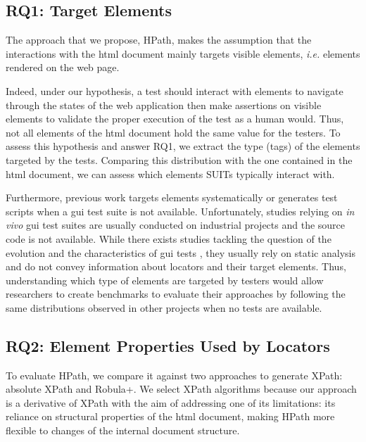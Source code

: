 \subsection{RQ1: Target Elements}
\label{sec:hpath-protocol-rq1}

The approach that we propose, HPath, makes the assumption that the interactions with the \gls{html} document mainly targets visible elements, \emph{i.e.} elements rendered on the web page. 

Indeed, under our hypothesis, a test should interact with elements to navigate through the states of the web application then make assertions on visible elements to validate the proper execution of the test as a human would. Thus, not all elements of the \gls{html} document hold the same value for the testers. To assess this hypothesis and answer RQ1, we extract the type (tags) of the elements targeted by the tests. Comparing this distribution with the one contained in the \gls{html} document, we can assess which elements SUITs typically interact with. 

Furthermore, previous work targets elements systematically\cite{Cohen2015, Leotta2015, Aldalur2017, Eladawy2018} or generates test scripts\cite{Grechanik2009, Montoto2011, Kirinuki2019} when a \gls{gui} test suite is not available. Unfortunately, studies relying on \emph{in vivo} \gls{gui} test suites are usually conducted on industrial projects and the source code is not available\cite{Thummalapenta2013, Yandrapally2014}. While there exists studies tackling the question of the evolution and the characteristics of \gls{gui} tests \cite{Christophe2014}, they usually rely on static analysis and do not convey information about locators and their target elements. Thus, understanding which type of elements are targeted by testers would allow researchers to create benchmarks to evaluate their approaches by following the same distributions observed in other projects when no tests are available.

\subsection{RQ2: Element Properties Used by Locators}
\label{sec:hpath-protocol-rq2}

To evaluate HPath, we compare it against two approaches to generate XPath: absolute XPath and Robula+. We select XPath algorithms because our approach is a derivative of XPath with the aim of addressing one of its limitations: its reliance on structural properties of the \gls{html} document, making HPath more flexible to changes of the internal document structure.

